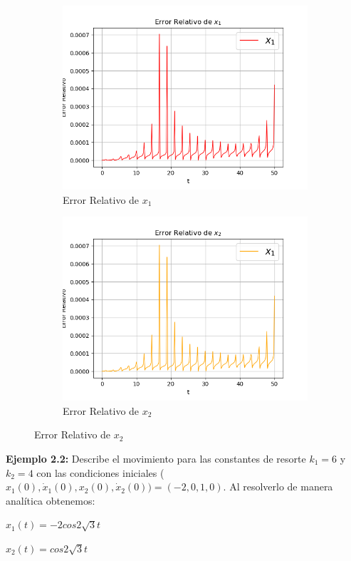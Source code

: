 \documentclass[a4paper]{article}
\begin{document}
\begin{figure}[ht!]
\begin{subfigure}{0.6\textwidth}
  \centering
  \includegraphics[width=\linewidth]{error2_1_1.png}
   \caption{Error Relativo de $x_1$}
\end{subfigure}
\begin{subfigure}{0.6\textwidth}
  \centering
  \includegraphics[width=\linewidth]{error2_1_2.png}
  \caption{Error Relativo de $x_2$}
\end{subfigure}
\end{figure}

\bigskip

\textbf{Ejemplo 2.2:} Describe el movimiento para las constantes de resorte $k_1 = 6$ y $k_2 = 4$ con las condiciones iniciales ($x_1(0), \dot x_1(0), x_2(0), \dot x_2(0)) = (-2,0,1,0)$.
Al resolverlo de manera analítica obtenemos:
\begin{center}
$x_1(t) = -2 cos 2\sqrt{3}t$

$x_2(t) = cos 2\sqrt{3}t$
\end{center}
\end{document}
